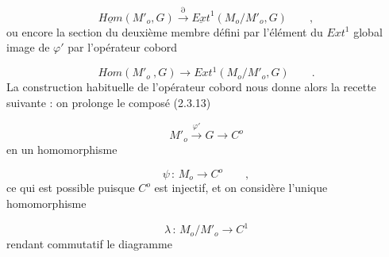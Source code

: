 \begin{equation*}
\underline{Hom}(M'_o,G) \overset{\partial}{\longrightarrow} \underline{Ext}^1(M_o/M'_o,G) \qquad ,
\end{equation*}
ou encore la section du deuxième membre défini par l'élément du $Ext^1$ global image de $\varphi'$ par l'opérateur cobord

\begin{equation*}
Hom(M'_o\ ,G) \longrightarrow Ext^1(M_o/M'_o,G) \qquad .
\end{equation*}
La construction habituelle de l'opérateur cobord nous donne alors la recette suivante : on prolonge le composé (2.3.13)

\begin{equation*}
M'_o \overset{\varphi'}{\longrightarrow} G \longrightarrow C^o
\end{equation*}
en un homomorphisme

\begin{equation*}
\psi \, : \, M_o \longrightarrow C^o \qquad ,
\end{equation*}
ce qui est possible puisque $C^o$ est injectif, et on considère l'unique homomorphisme

\begin{equation}\tag{2.3.15}
\lambda \, : \, M_o/M'_o \longrightarrow C^1
\end{equation}
rendant commutatif le diagramme

\begin{center}
\end{center}

